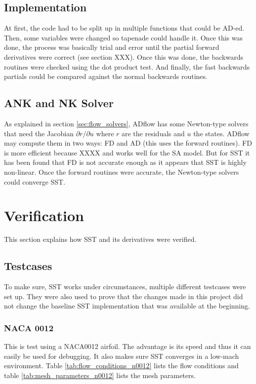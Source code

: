 \subsection{Implementation}
At first, the code had to be split up in multiple functions that could be
AD-ed. Then, some variables were changed so tapenade could handle it. Once this
was done, the process was basically trial and error until the partial forward
derivatives were correct (see section XXX). Once this was done, the backwards
routines were checked using the dot product test. And finally, the fast
backwards partials could be compared against the normal backwards routines.




\subsection{ANK and NK Solver}
As explained in section \ref{sec:flow_solvers}, ADflow has some Newton-type
solvers that need the Jacobian $\partial r / \partial u$ where $r$ are the
residuals and $u$ the states. ADflow may compute them in two ways: FD and AD
(this uses the forward routines). FD is more efficient because XXXX and works
well for the SA model. But for SST it has been found that FD is not accurate
enough as it appears that SST is highly non-linear. Once the forward routines
were accurate, the Newton-type solvers could converge SST.








\section{Verification}
This section explains how SST and its derivatives were verified.




\subsection{Testcases}
To make sure, SST works under circumstances, multiple different testcases
were set up. They were also used to prove that the changes made in this project
did not change the baseline SST implementation that was available at the
beginning.


\subsubsection{NACA 0012}
This is test using a NACA0012 airfoil. The advantage is its speed and thus it
can easily be used for debugging. It also makes sure SST converges in a
low-mach environment. Table \ref{tab:flow_conditions_n0012} lists the flow
conditions and table \ref{tab:mesh_parameters_n0012} lists the mesh parameters.

